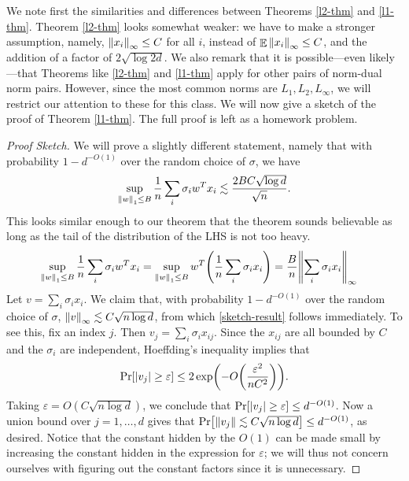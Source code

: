 \documentclass[11pt]{article}
\DeclareMathOperator*{\E}{\mathbb E}
\let\eps\varepsilon
\begin{document}
We note first the similarities and differences between Theorems \ref{l2-thm} and \ref{l1-thm}. Theorem \ref{l2-thm} looks somewhat weaker: we have to make a stronger assumption, namely, $\norm{x_i}_\infty \le C$ for all $i$, instead of $\E \norm{x_i}_\infty \le C$, and the addition of a factor of $2 \sqrt{\log 2d}$. We also remark that it is possible---even likely---that Theorems like \ref{l2-thm} and \ref{l1-thm} apply for other pairs of norm-dual norm pairs. However, since the most common norms are $L_1, L_2, L_\infty$, we will restrict our attention to these for this class. We will now give a sketch of the proof of Theorem \ref{l1-thm}. The full proof is left as a homework problem.
\begin{proof}[Proof Sketch]
We will prove a slightly different statement, namely that with probability $1 - d^{-O(1)}$ over the random choice of $\sigma$, we have 
\begin{align}\label{sketch-result}
\sup_{\norm{w}_1 \le B}  \frac 1n \sum_i \sigma_i w^T x_i \lesssim \frac{2BC \sqrt{\log d}}{\sqrt{n}}.
\end{align}
This looks similar enough to our theorem that the theorem sounds believable as long as the tail of the distribution of the LHS is not too heavy. 
\begin{align}
\sup_{\norm{w}_1 \le B} \frac 1n \sum_i \sigma_i w^T x_i 
&= \sup_{\norm{w}_1 \le B} w^T \qty( \frac 1n \sum_i \sigma_i  x_i)
= \frac{B}{n} \norm{\sum_i \sigma_i  x_i}_\infty
\end{align}
Let $v = \sum_i \sigma_i x_i$. We claim that, with probability $1 - d^{-O(1)}$ over the random choice of $\sigma$, $\norm{v}_\infty \lesssim C \sqrt{n \log d}$, from which \eqref{sketch-result} follows immediately. To see this, fix an index $j$. Then
$
v_j = \sum_i \sigma_i x_{ij}
$. 
Since the $x_{ij}$ are all bounded by $C$ and the $\sigma_i$ are independent, Hoeffding's inequality implies that 
\begin{align}
\Pr[\abs{v_j} \ge \eps] \le 2 \exp( -O\qty(\frac{\eps^2}{nC^2}) ).
\end{align}
Taking $\eps = O(C \sqrt{n \log d})$, we conclude that $\Pr[\abs{v_j} \ge \eps] \le d^{-O(1)}$. Now a union bound over $j = 1, \dots, d$ gives that $\Pr[\norm{v_j} \lesssim C \sqrt{n \log d}] \le d^{-O(1)}$, as desired. Notice that the constant hidden by the $O(1)$ can be made small by increasing the constant hidden in the expression for $\eps$; we will thus not concern ourselves with figuring out the constant factors since it is unnecessary.
\end{proof}
\end{document}

